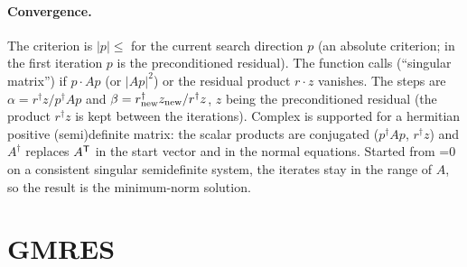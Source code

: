 \paragraph{Convergence.} The criterion is $|p|\le$  for the current search direction $p$ (an absolute criterion;
in the first iteration $p$ is the preconditioned residual). The function calls  (``singular matrix'') if
$p\cdot Ap$ (or $|Ap|^2$) or the residual product $r\cdot z$ vanishes. The steps are $\alpha = r^\dagger z/p^\dagger Ap$ and
$\beta = r_{\rm new}^\dagger z_{\rm new}/r^\dagger z$, $z$ being the preconditioned residual (the product $r^\dagger z$ is kept
between the iterations). Complex  is supported for a hermitian
positive (semi)definite matrix: the scalar products are conjugated ($p^\dagger Ap$, $r^\dagger z$) and $A^\dagger$ replaces
$A^{\mathsf T}$ in the start vector and in the normal equations. Started from =0 on a consistent singular semidefinite system,
the iterates stay in the range of $A$, so the result is the minimum-norm solution.

\section{GMRES}\label{sec:iterative:gmres}


